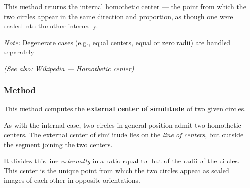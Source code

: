 \medskip

This method returns the internal homothetic center — the point from which the two circles appear in the same direction and proportion, as though one were scaled into the other internally.

\medskip

\emph{Note:} Degenerate cases (e.g., equal centers, equal or zero radii) are handled separately.
\begin{flushright}
\small
\href{https://en.wikipedia.org/wiki/Homothetic_center}{\textit{(See also: Wikipedia — Homothetic center)}}
\end{flushright}

\vspace{1em}


\begin{tkzexample}[latex=.5\textwidth]
 \begin{center}
 \end{center}
\end{tkzexample}

\subsubsection{Method }
\label{ssub:method_circle_external__similitude}


This method computes the \textbf{external center of similitude} of two given circles.

\medskip

As with the internal case, two circles in general position admit two homothetic centers. The external center of similitude lies on the \emph{line of centers}, but outside the segment joining the two centers.

\medskip

It divides this line \emph{externally} in a ratio equal to that of the radii of the circles. This center is the unique point from which the two circles appear as scaled images of each other in opposite orientations.

